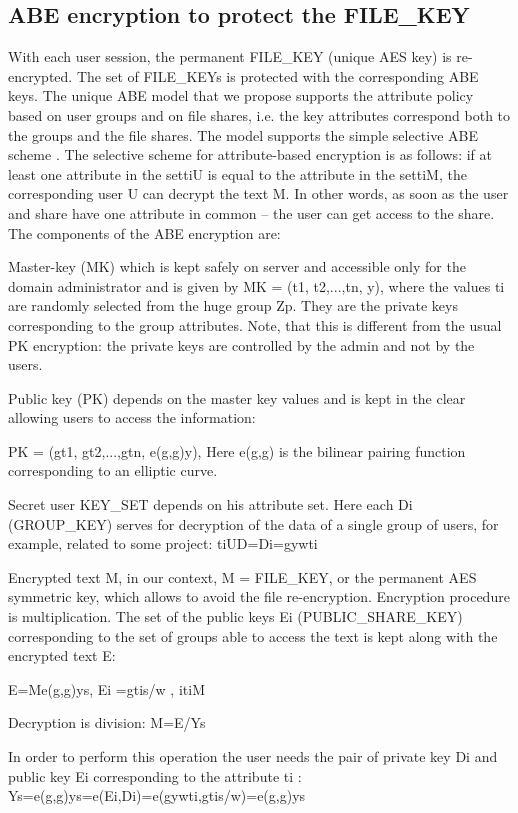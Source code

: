 \documentclass[twocolumn]{svjour3}          %
\begin{document}
\subsection{ABE encryption to protect the FILE\_KEY }
\label{sec_abe}
With each user session, the permanent FILE\_KEY (unique AES key) is re-encrypted. The set of FILE\_KEYs is protected with the corresponding ABE keys. The unique ABE model that we propose supports the attribute policy based on user groups and on file shares, i.e. the key attributes correspond both to the groups and the file shares.
The model supports the simple selective ABE scheme \cite{galibus2015cloud,galibus2014}. The selective scheme for attribute-based encryption is as follows: if at least one attribute in the set{ti}U is equal to the attribute in the set{ti}M, the corresponding user U can decrypt the text M. In other words, as soon as the user and share have one attribute in common – the user can get access to the share. The components of the ABE encryption are:

Master-key (MK) which is kept safely on server and accessible only for the domain administrator and is given by
MK = (t1, t2,...,tn, y),
where the values ti are randomly selected from the huge group Zp. They are the private keys corresponding to the group attributes. Note, that this is different from the usual PK encryption: the private keys are controlled by the admin and not by the users.

Public key (PK) depends on the master key values and is kept in the clear allowing users to access the information:

PK = (gt1, gt2,...,gtn, e(g,g)y),
Here e(g,g) is the bilinear pairing function corresponding to an elliptic curve.

Secret user KEY\_SET depends on his attribute set. Here each Di (GROUP\_KEY) serves for decryption of the data of a single group of users, for example, related to some project:
{ti}UD={Di=gywti}

Encrypted text M, in our context, M = FILE\_KEY, or the permanent AES symmetric key, which allows to avoid the file re-encryption. Encryption procedure is multiplication. The set of the public keys Ei (PUBLIC\_SHARE\_KEY) corresponding to the set of groups able to access the text is kept along with the encrypted text E:

E=Me(g,g)ys,{ Ei =gtis/w }, i{ti}M

Decryption is division:
M=E/Ys

In order to perform this operation the user needs the pair of private key Di and public key Ei corresponding to the attribute ti :
Ys=e(g,g)ys=e(Ei,Di)=e(gywti,gtis/w)=e(g,g)ys
\end{document}
